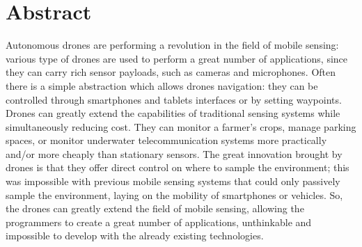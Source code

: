 \chapter*{Abstract}


Autonomous drones are performing a revolution in the field of mobile sensing:
various type of drones are used to perform a great number of applications, since they can carry rich sensor payloads, such as cameras and microphones.
Often there is a simple abstraction which allows drones navigation: they can be controlled through smartphones and tablets interfaces or by setting waypoints.
Drones can greatly extend the capabilities of traditional sensing systems while simultaneously reducing cost.
They can monitor a farmer’s crops, manage parking spaces, or monitor underwater telecommunication systems more practically and/or more cheaply than stationary sensors.
The great innovation brought by drones is that they offer direct control on where to sample the environment; this was impossible with previous mobile sensing systems that could only passively sample the environment, laying on the mobility of smartphones or vehicles.
So, the drones can greatly extend the field of mobile sensing, allowing the programmers to create a great number of applications, unthinkable and impossible to develop with the already existing technologies.
